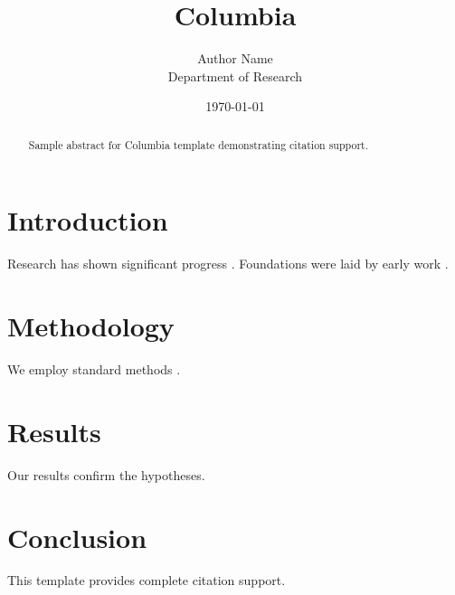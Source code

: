 \documentclass{thesis_columbia}
\title{Columbia}
\author{Author Name \\ \small Department of Research}
\date{\today}
\begin{document}
\maketitle

\begin{abstract}
Sample abstract for Columbia template demonstrating citation support.
\end{abstract}

\section{Introduction}
Research has shown significant progress \citep{einstein1905}. Foundations were laid by early work \citep{turing1950}.

\section{Methodology}
We employ standard methods \citep{knuth1984}.

\section{Results}
Our results confirm the hypotheses.

\section{Conclusion}
This template provides complete citation support.



\end{document}
